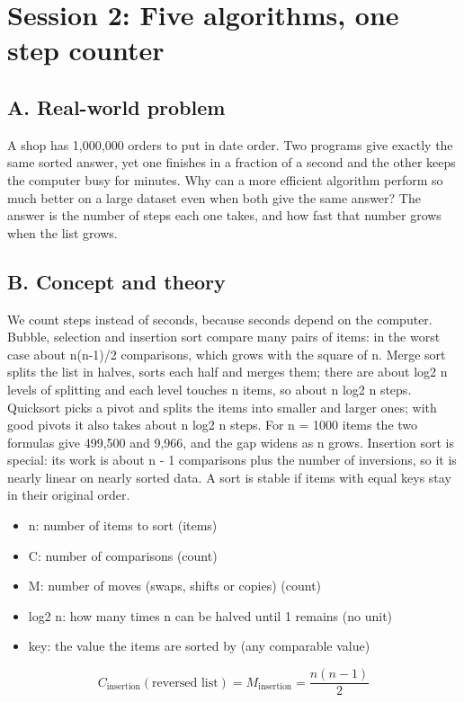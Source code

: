 \documentclass[11pt,a4paper]{article}
\begin{document}
\section{Session 2: Five algorithms, one step counter}

\subsection*{A. Real-world problem}
A shop has 1,000,000 orders to put in date order. Two programs give exactly the same sorted answer, yet one finishes in a fraction of a second and the other keeps the computer busy for minutes. Why can a more efficient algorithm perform so much better on a large dataset even when both give the same answer? The answer is the number of steps each one takes, and how fast that number grows when the list grows.

\subsection*{B. Concept and theory}
We count steps instead of seconds, because seconds depend on the computer. Bubble, selection and insertion sort compare many pairs of items: in the worst case about n(n-1)/2 comparisons, which grows with the square of n. Merge sort splits the list in halves, sorts each half and merges them; there are about log2 n levels of splitting and each level touches n items, so about n log2 n steps. Quicksort picks a pivot and splits the items into smaller and larger ones; with good pivots it also takes about n log2 n steps. For n = 1000 items the two formulas give 499,500 and 9,966, and the gap widens as n grows. Insertion sort is special: its work is about n - 1 comparisons plus the number of inversions, so it is nearly linear on nearly sorted data. A sort is stable if items with equal keys stay in their original order.

\begin{itemize}[nosep]
\item n: number of items to sort (items)
\item C: number of comparisons (count)
\item M: number of moves (swaps, shifts or copies) (count)
\item log2 n: how many times n can be halved until 1 remains (no unit)
\item key: the value the items are sorted by (any comparable value)
\end{itemize}

\begin{equation*}
C_{\text{insertion}}(\text{reversed list})=M_{\text{insertion}}=\frac{n(n-1)}{2}
\end{equation*}
\end{document}
